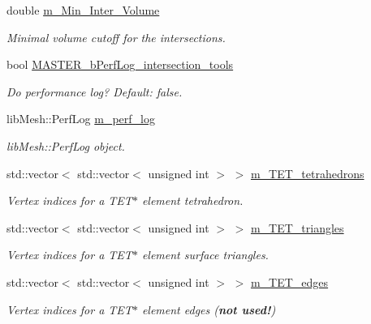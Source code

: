 \begin{DoxyCompactItemize}
\item 
double \hyperlink{classcarl_1_1_intersection___tools_a931ecd3fd3103656ede9c84a2eed10d2}{m\+\_\+\+Min\+\_\+\+Inter\+\_\+\+Volume}
\begin{DoxyCompactList}\small\item\em Minimal volume cutoff for the intersections. \end{DoxyCompactList}\item 
bool \hyperlink{classcarl_1_1_intersection___tools_a651c43f074c2955bd58ef0d519c6ef73}{M\+A\+S\+T\+E\+R\+\_\+b\+Perf\+Log\+\_\+intersection\+\_\+tools}
\begin{DoxyCompactList}\small\item\em Do performance log? {\itshape Default\+:} false. \end{DoxyCompactList}\item 
lib\+Mesh\+::\+Perf\+Log \hyperlink{classcarl_1_1_intersection___tools_afe18e6ca5fd12bae08efb98f69c71a48}{m\+\_\+perf\+\_\+log}
\begin{DoxyCompactList}\small\item\em lib\+Mesh\+::\+Perf\+Log object. \end{DoxyCompactList}\item 
std\+::vector$<$ std\+::vector$<$ unsigned int $>$ $>$ \hyperlink{classcarl_1_1_intersection___tools_a6e9a49f3b382810c884ba46b791bfcb8}{m\+\_\+\+T\+E\+T\+\_\+tetrahedrons}
\begin{DoxyCompactList}\small\item\em Vertex indices for a T\+E\+T$\ast$ element tetrahedron. \end{DoxyCompactList}\item 
std\+::vector$<$ std\+::vector$<$ unsigned int $>$ $>$ \hyperlink{classcarl_1_1_intersection___tools_a54e026b256ab6894b1f77950a425b1eb}{m\+\_\+\+T\+E\+T\+\_\+triangles}
\begin{DoxyCompactList}\small\item\em Vertex indices for a T\+E\+T$\ast$ element surface triangles. \end{DoxyCompactList}\item 
std\+::vector$<$ std\+::vector$<$ unsigned int $>$ $>$ \hyperlink{classcarl_1_1_intersection___tools_a153baf989b64fb7033e42ba2342e0fc5}{m\+\_\+\+T\+E\+T\+\_\+edges}
\begin{DoxyCompactList}\small\item\em Vertex indices for a T\+E\+T$\ast$ element edges ({\bfseries not used!}) \end{DoxyCompactList}\item 

\end{DoxyCompactItemize}
